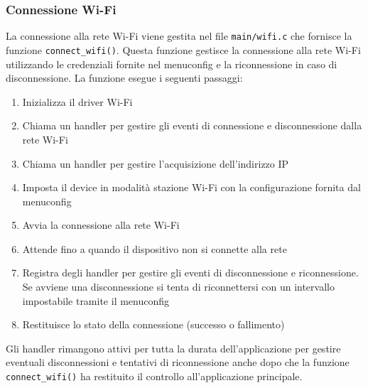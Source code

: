 \documentclass[a4paper]{article}
\begin{document}
\subsubsection{Connessione Wi-Fi}
La connessione alla rete Wi-Fi viene gestita nel file \texttt{main/wifi.c} che
fornisce la funzione \texttt{connect\_wifi()}. Questa funzione gestisce la connessione
alla rete Wi-Fi utilizzando le credenziali fornite nel menuconfig e la riconnessione
in caso di disconnessione. La funzione esegue i seguenti passaggi:
\begin{enumerate}
  \item Inizializza il driver Wi-Fi
  \item Chiama un handler per gestire gli eventi di connessione e disconnessione 
    dalla rete Wi-Fi
  \item Chiama un handler per gestire l'acquisizione dell'indirizzo IP
  \item Imposta il device in modalità stazione Wi-Fi con la configurazione fornita
    dal menuconfig
  \item Avvia la connessione alla rete Wi-Fi
  \item Attende fino a quando il dispositivo non si connette alla rete
  \item Registra degli handler per gestire gli eventi di disconnessione e
    riconnessione. Se avviene una disconnessione si tenta di riconnettersi con un
    intervallo impostabile tramite il menuconfig
  \item Restituisce lo stato della connessione (successo o fallimento)
\end{enumerate}
Gli handler rimangono attivi per tutta la durata dell'applicazione per gestire
eventuali disconnessioni e tentativi di riconnessione anche dopo che la funzione
\texttt{connect\_wifi()} ha restituito il controllo all'applicazione principale.
\end{document}
